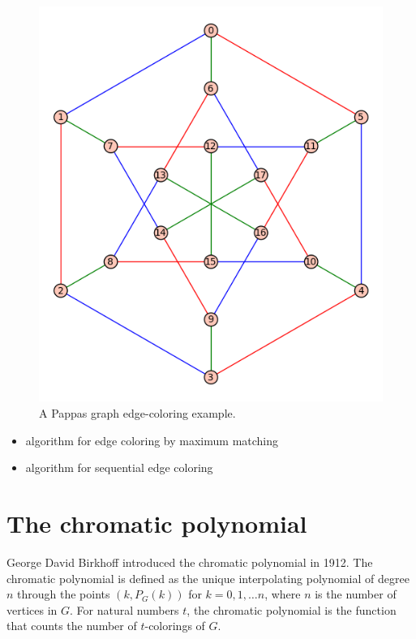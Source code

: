 \begin{example}
\begin{figure}[!htbp]
\centering
{}
\includegraphics[scale=0.7]{image/graph-coloring/pappas-graph-edge-coloring-example}
\caption{A Pappas graph edge-coloring example.}
\label{fig:graph-coloring:pappas-graph-edge-coloring-example}
\end{figure}

\end{example}



\begin{itemize}
\item algorithm for edge coloring by maximum matching
\item algorithm for sequential edge coloring
\end{itemize}



\section{The chromatic polynomial}

George David Birkhoff introduced the chromatic polynomial in 1912.
The chromatic polynomial is defined as the unique interpolating
polynomial of degree $n$ through the points $(k,P_G(k))$ for
$k=0,1,\dots n$, where $n$ is the number of vertices in $G$.
For natural numbers $t$, the chromatic polynomial is the function
that counts the
number of $t$-colorings of $G$.

